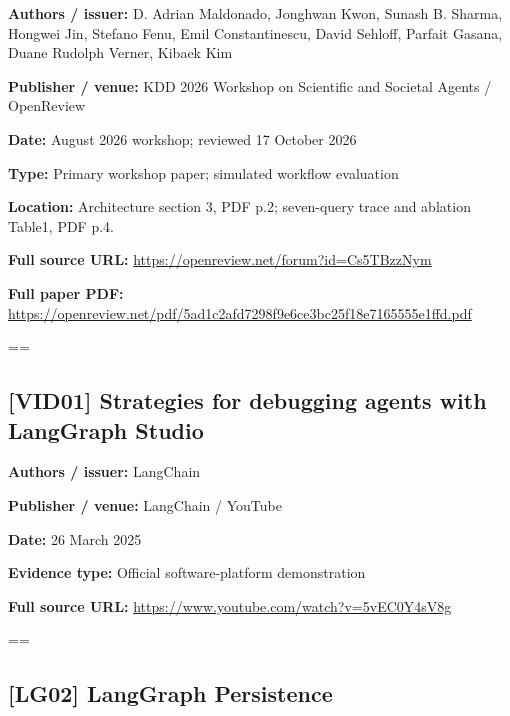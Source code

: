 \documentclass[10pt,letterpaper]{article}
\begin{document}
\textbf{Authors / issuer:} D. Adrian Maldonado, Jonghwan Kwon, Sunash B. Sharma, Hongwei Jin, Stefano Fenu, Emil Constantinescu, David Sehloff, Parfait Gasana, Duane Rudolph Verner, Kibaek Kim\par
\textbf{Publisher / venue:} KDD 2026 Workshop on Scientific and Societal Agents / OpenReview\par
\textbf{Date:} August 2026 workshop; reviewed 17 October 2026\par
\textbf{Type:} Primary workshop paper; simulated workflow evaluation\par
\textbf{Location:} Architecture section 3, PDF p.2; seven-query trace and ablation Table1, PDF p.4.\par
\textbf{Full source URL:} \href{https://openreview.net/forum?id=Cs5TBzzNym}{\small\ttfamily https:/\allowbreak{}/\allowbreak{}openreview.\allowbreak{}net/\allowbreak{}forum?\allowbreak{}id=\allowbreak{}Cs5TBzzNym}\par
\textbf{Full paper PDF:} \href{https://openreview.net/pdf/5ad1c2afd7298f9e6ce3bc25f18e7165555e1ffd.pdf}{\small\ttfamily https:/\allowbreak{}/\allowbreak{}openreview.\allowbreak{}net/\allowbreak{}pdf/\allowbreak{}5ad1c2afd7298f9e6ce3bc25f18e7165555e1ffd.\allowbreak{}pdf}\par
\egroup\par\noindent\box\readingEntry\par\medskip
\setbox\readingEntry=\vbox\bgroup\hsize=\linewidth\subsection*{[VID01] Strategies for debugging agents with LangGraph Studio}
\textbf{Authors / issuer:} LangChain\par
\textbf{Publisher / venue:} LangChain / YouTube\par
\textbf{Date:} 26 March 2025\par
\textbf{Evidence type:} Official software-platform demonstration\par
\textbf{Full source URL:} \href{https://www.youtube.com/watch?v=5vEC0Y4sV8g}{\small\ttfamily https:/\allowbreak{}/\allowbreak{}www.\allowbreak{}youtube.\allowbreak{}com/\allowbreak{}watch?\allowbreak{}v=\allowbreak{}5vEC0Y4sV8g}\par
\egroup\par\noindent\box\readingEntry\par\medskip
\setbox\readingEntry=\vbox\bgroup\hsize=\linewidth\subsection*{[LG02] LangGraph Persistence}
\end{document}
